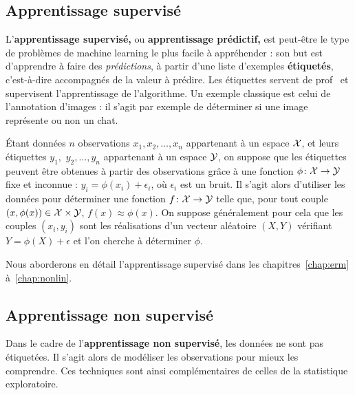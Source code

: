\subsection{Apprentissage supervisé}
L'\textbf{apprentissage supervisé,} ou \textbf{apprentissage prédictif,} est peut-être le type de problèmes de machine
learning le plus facile à appréhender : son but est d'apprendre à faire des
{\it prédictions}, à partir d'une liste d'exemples \textbf{étiquetés},
c'est-à-dire accompagnés de la valeur à prédire. Les étiquettes servent de \og
prof \fg~et supervisent l'apprentissage de l'algorithme. Un exemple classique est celui de l'annotation d'images : il s'agit par exemple de déterminer si une image représente ou non un chat.

Étant données $n$ {observations} $x_1, x_2, \ldots, x_n$ appartenant à un
espace $\mathcal{X}$, et leurs {étiquettes} $y_1,$ $y_2, \ldots, y_n$ appartenant à un
espace $\mathcal{Y}$, on suppose que les étiquettes peuvent être obtenues à partir des
observations grâce à une fonction $\phi \colon \mathcal{X} \to \mathcal{Y}$ fixe et inconnue
: $y_i = \phi(x_i) + \epsilon_i$, où $\epsilon_i$ est un bruit.  Il
s'agit alors d'utiliser les données pour déterminer une fonction
$f \colon \mathcal{X} \to \mathcal{Y}$ telle que, pour tout couple
$(x, \phi(x)) \in \mathcal{X} \times \mathcal{Y}$, $f(x) \approx \phi(x)$. On suppose généralement pour cela que les couples $(x_i, y_i)$ sont les réalisations d'un vecteur aléatoire $(X, Y)$ vérifiant $Y = \phi(X) + \epsilon$ et l'on cherche à déterminer $\phi$.

Nous aborderons en détail l'apprentissage supervisé dans les chapitres~\ref{chap:erm} à~\ref{chap:nonlin}.

\subsection{Apprentissage non supervisé}
\label{sec:nonsup_ml}
Dans le cadre de l'\textbf{apprentissage non supervisé}, les données ne sont
pas étiquetées. Il s'agit alors de modéliser les observations pour mieux les
comprendre. Ces techniques sont ainsi complémentaires de celles de la
statistique exploratoire.

